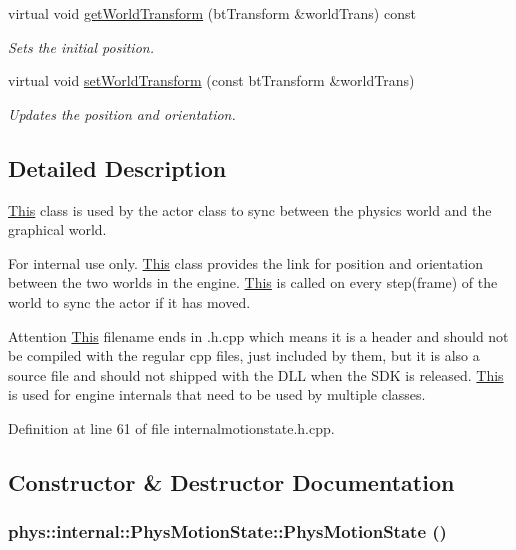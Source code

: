 \begin{DoxyCompactItemize}
virtual void \hyperlink{classphys_1_1internal_1_1PhysMotionState_a8daeae588d49f07da6c6dfec83de45c3}{getWorldTransform} (btTransform \&worldTrans) const 
\begin{DoxyCompactList}\small\item\em Sets the initial position. \item\end{DoxyCompactList}\item 
virtual void \hyperlink{classphys_1_1internal_1_1PhysMotionState_a1fe29e3e661cdbbfb846fbd0ac91ec37}{setWorldTransform} (const btTransform \&worldTrans)
\begin{DoxyCompactList}\small\item\em Updates the position and orientation. \item\end{DoxyCompactList}\end{DoxyCompactItemize}


\subsection{Detailed Description}
\hyperlink{structThis}{This} class is used by the actor class to sync between the physics world and the graphical world. \begin{DoxyInternal}{For internal use only.}
\hyperlink{structThis}{This} class provides the link for position and orientation between the two worlds in the engine. \hyperlink{structThis}{This} is called on every step(frame) of the world to sync the actor if it has moved. \begin{DoxyAttention}{Attention}
\hyperlink{structThis}{This} filename ends in .h.cpp which means it is a header and should not be compiled with the regular cpp files, just included by them, but it is also a source file and should not shipped with the DLL when the SDK is released. \hyperlink{structThis}{This} is used for engine internals that need to be used by multiple classes. 
\end{DoxyAttention}
\end{DoxyInternal}


Definition at line 61 of file internalmotionstate.h.cpp.



\subsection{Constructor \& Destructor Documentation}
\hypertarget{classphys_1_1internal_1_1PhysMotionState_a64d423e8d2ccec0c7acce7701c898dd0}{
\subsubsection[{PhysMotionState}]{\setlength{\rightskip}{0pt plus 5cm}phys::internal::PhysMotionState::PhysMotionState ()}}
\label{dc/df8/classphys_1_1internal_1_1PhysMotionState_a64d423e8d2ccec0c7acce7701c898dd0}


